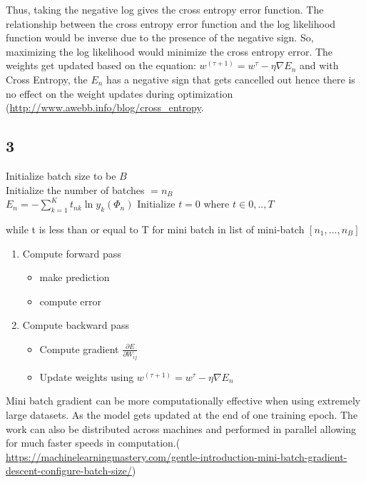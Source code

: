 \documentclass[a4paper]{article}
\begin{document}
Thus, taking the negative log gives the cross entropy error function. The relationship between the cross entropy error function and the log likelihood function would be inverse due to the presence of the negative sign. So, maximizing the log likelihood would minimize the cross entropy error.
The weights get updated based on the equation: $w^{(\tau + 1)} = w^{\tau} - \eta \nabla E_{n}$ and with Cross Entropy, the $E_{n}$ has a negative sign that gets cancelled out hence there is no effect on the weight updates during optimization  (\url{http://www.awebb.info/blog/cross\_entropy}.



\subsection*{3}
Initialize batch size to be $B$ \\
Initialize the number of batches $= n_{B}$ \\
$E_{n} = -\sum_{k=1}^{K}t_{nk}\ln{y_{k}}(\Phi_{n})$
Initialize $t = 0$ where $t \in {0,..,T}$

while t is less than or equal to T
for mini batch in list of mini-batch $[n_{1},...,n_{B}]$
\begin{enumerate}
    \item Compute forward pass
        \begin{itemize}
            \item make prediction
            \item compute error
        \end{itemize}{}
    \item Compute backward pass
    \begin{itemize}
        \item Compute gradient $\frac{\partial E}{\partial W_{ij}}$
        \item Update weights using $w^{(\tau + 1)} = w^{\tau} - \eta \nabla E_{n}$  
    \end{itemize}{}
\end{enumerate}{}

Mini batch gradient can be more computationally effective when using extremely large datasets. As the model gets updated at the end of one training epoch. The work can also be distributed across machines and performed in parallel  allowing for much faster speeds in computation.( \url{https://machinelearningmastery.com/gentle-introduction-mini-batch-gradient-descent-configure-batch-size/})
\bigskip
\end{document}
